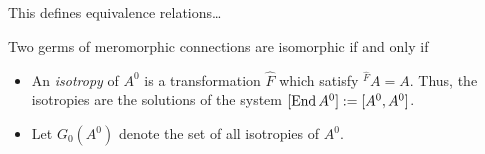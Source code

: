 This defines equivalence relations\dots \TODO

\begin{defn}
  Two germs of meromorphic connections are isomorphic if and only if \TODO
\end{defn}

\begin{defn}
  \begin{itemize}
    \item An \emph{isotropy} of $A^0$ is a transformation $\hat F$ which
      satisfy ${}^{\hat F}\!A=A$. Thus, the isotropies are the solutions of the
      system $[\operatorname{End} A^0]:=[A^0,A^0]$.
    \item Let $G_0(A^0)$ denote the set of all isotropies of $A^0$.
  \end{itemize}
\end{defn}



